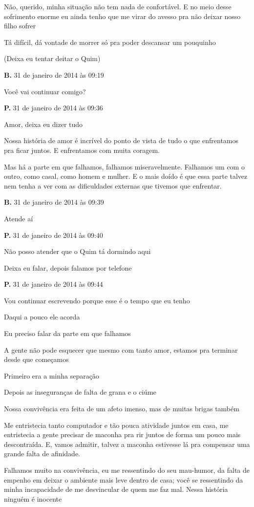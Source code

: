 {{{Não, querido, minha situação não tem nada de confortável. E no meio
desse sofrimento enorme eu ainda tenho que me virar do avesso pra não
deixar nosso filho sofrer

Tá difícil, dá vontade de morrer só pra poder descansar um pouquinho

(Deixa eu tentar deitar o Quim)

\textbf{B.} 31 de janeiro de 2014 às 09:19

Você vai continuar comigo?

\textbf{P.} 31 de janeiro de 2014 às 09:36

Amor, deixa eu dizer tudo

Nossa história de amor é incrível do ponto de vista de tudo o que
enfrentamos pra ficar juntos. E enfrentamos com muita coragem.

Mas há a parte em que falhamos, falhamos miseravelmente. Falhamos um com
o outro, como casal, como homem e mulher. E o mais doído é que essa
parte talvez nem tenha a ver com as dificuldades externas que tivemos
que enfrentar.

\textbf{B.} 31 de janeiro de 2014 às 09:39

Atende aí

\textbf{P.} 31 de janeiro de 2014 às 09:40

Não posso atender que o Quim tá dormindo aqui

Deixa eu falar, depois falamos por telefone

\textbf{P.} 31 de janeiro de 2014 às 09:44

Vou continuar escrevendo porque esse é o tempo que eu tenho

Daqui a pouco ele acorda

Eu preciso falar da parte em que falhamos

A gente não pode esquecer que mesmo com tanto amor, estamos pra terminar
desde que começamos

Primeiro era a minha separação

Depois as inseguranças de falta de grana e o ciúme

Nossa convivência era feita de um afeto imenso, mas de muitas brigas
também

Me entristecia tanto computador e tão pouca atividade juntos em casa, me
entristecia a gente precisar de maconha pra rir juntos de forma um pouco
mais descontraída. E, vamos admitir, talvez a maconha estivesse lá pra
compensar uma grande falta de afinidade.

Falhamos muito na convivência, eu me ressentindo do seu mau-humor, da
falta de empenho em deixar o ambiente mais leve dentro de casa; você se
ressentindo da minha incapacidade de me desvincular de quem me faz mal.
Nessa história ninguém é inocente

}}}
